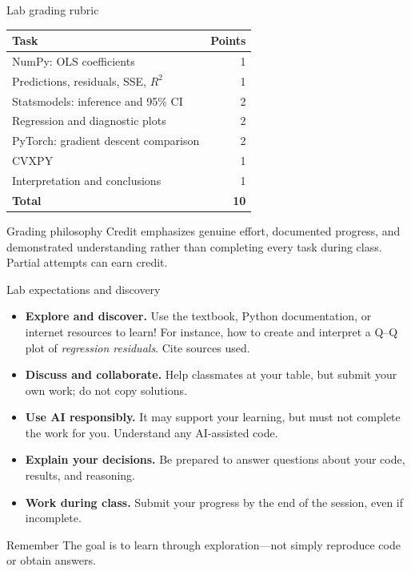 \documentclass[aspectratio=43,11pt]{beamer}
\begin{document}
\begin{frame}{Lab grading rubric}
\small
\begin{center}
\begin{tabular}{lr}
\toprule
\textbf{Task} & \textbf{Points}\\
\midrule
NumPy: OLS coefficients & 1\\
Predictions, residuals, SSE, $R^2$ & 1\\
Statsmodels: inference and 95\% CI & 2\\
Regression and diagnostic plots & 2\\
PyTorch: gradient descent comparison & 2\\
CVXPY & 1\\
Interpretation and conclusions & 1\\
\midrule
\textbf{Total} & \textbf{10}\\
\bottomrule
\end{tabular}
\end{center}
\medskip
\begin{block}{Grading philosophy}
Credit emphasizes genuine effort, documented progress, and demonstrated understanding rather than completing every task during class. Partial attempts can earn credit.
\end{block}
\end{frame}

\begin{frame}{Lab expectations and discovery}
\footnotesize
\begin{itemize}
\setlength{\itemsep}{5pt}
\item \textbf{Explore and discover.} Use the textbook, Python documentation, or internet resources to learn! For instance, how to create and interpret a Q--Q plot of \emph{regression residuals}. Cite sources used.
\item \textbf{Discuss and collaborate.} Help classmates at your table, but submit your own work; do not copy solutions.
\item \textbf{Use AI responsibly.} It may support your learning, but must not complete the work for you. Understand any AI-assisted code.
\item \textbf{Explain your decisions.} Be prepared to answer questions about your code, results, and reasoning.
\item \textbf{Work during class.} Submit your progress by the end of the session, even if incomplete.
\end{itemize}
\begin{block}{Remember}
The goal is to learn through exploration---not simply reproduce code or obtain answers.
\end{block}
\end{frame}
\end{document}
